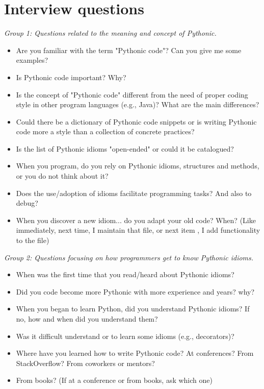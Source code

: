 \documentclass[a4paper]{article}
\begin{document}
\section{Interview questions}
\textit{Group 1: Questions related to the meaning and concept of Pythonic.}
\begin{itemize}
   \item Are you familiar with the term "Pythonic code"? Can you give me some examples?
  
  \item Is Pythonic code important? Why?
  
  \item Is the concept of "Pythonic code" different from the need of proper coding style in other program languages (e.g., Java)? What are the main differences?
  \item Could there be a dictionary of Pythonic code snippets or is writing Pythonic code more a style than a collection of concrete practices?
  \item Is the list of Pythonic idioms "open-ended" or could it be catalogued?
  \item When you program, do you rely on Pythonic idioms, structures and methods, or you do not think about it?
  \item Does the use/adoption of idioms facilitate programming tasks? And also to debug?
  \item When you discover a new idiom... do you adapt your old code? When? (Like immediately, next time, I maintain that file, or next item , I add functionality to the file)
\end{itemize}

\textit{Group 2: Questions focusing on how programmers get to know Pythonic idioms.}
\begin{itemize}
  \item When was the first time that you read/heard about Pythonic idioms?
  \item Did you code become more Pythonic with more experience and years? why?
  \item When you began to learn Python, did you understand Pythonic idioms? If no, how and when did you understand them?
  \item Was it difficult understand or to learn some idioms (e.g., decorators)?
  \item Where have you learned how to write Pythonic code? At conferences? From StackOverflow? From coworkers or mentors? \item From books? (If at a conference or from books, ask which one)
\end{itemize}
\end{document}
